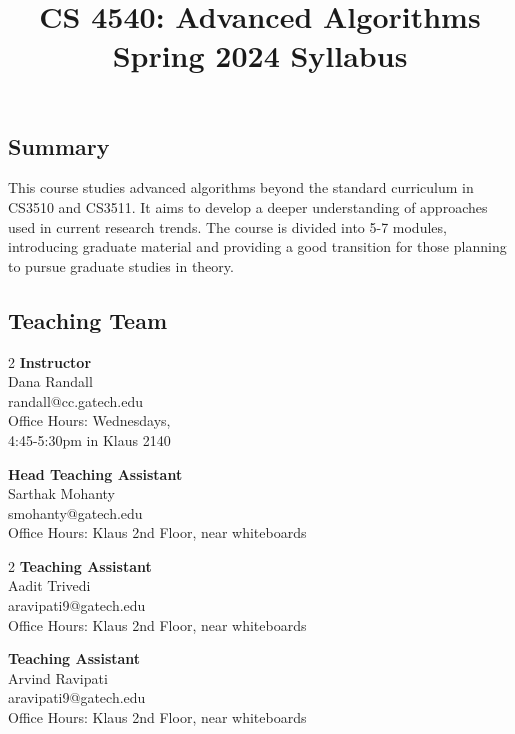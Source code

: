 \documentclass{article}
\title{\vspace{-1cm}CS 4540: Advanced Algorithms \\Spring 2024 Syllabus\vspace{-1cm}}
\author{}
\date{}
\begin{document}
\maketitle

\subsection*{Summary}
    This course studies advanced algorithms beyond the standard curriculum in CS3510 and CS3511. It aims to develop a deeper understanding of approaches used in current research trends. The course is divided into 5-7 modules, introducing graduate material and providing a good transition for those planning to pursue graduate studies in theory.

\subsection*{Teaching Team}
    \begin{multicols}{2}
        \textbf{Instructor} \\
        Dana Randall \\
        randall@cc.gatech.edu \\
        Office Hours: Wednesdays, \\
        4:45-5:30pm in Klaus 2140

        \columnbreak

        \textbf{Head Teaching Assistant} \\
        Sarthak Mohanty \\
        smohanty@gatech.edu \\
        Office Hours: Klaus 2nd Floor, near whiteboards
    \end{multicols}
    \begin{multicols}{2}
        \textbf{Teaching Assistant} \\
        Aadit Trivedi \\
        aravipati9@gatech.edu \\
        Office Hours: Klaus 2nd Floor, near whiteboards

        \columnbreak

        \textbf{Teaching Assistant} \\
        Arvind Ravipati \\
        aravipati9@gatech.edu \\
        Office Hours: Klaus 2nd Floor, near whiteboards
    \end{multicols}
\end{document}
